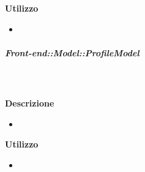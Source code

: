         \textbf{Utilizzo}  
          \begin{itemize}
            \item[] 
          \end{itemize}
      \subparagraph{Front-end::Model::ProfileModel}
        
        \textbf{\\ \\ Descrizione} 
          \begin{itemize}
            \item[] 
          \end{itemize}      
        \textbf{Utilizzo}  
          \begin{itemize}
            \item[] 
          \end{itemize}